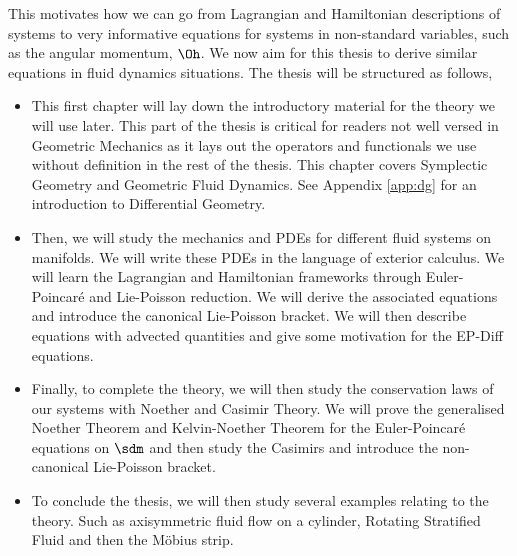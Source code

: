 \noindent
This motivates how we can go from Lagrangian and Hamiltonian descriptions of systems to very informative equations for systems in non-standard variables, such as the angular momentum, $\Oh$. We now aim for this thesis to derive similar equations in fluid dynamics situations. The thesis will be structured as follows,
\begin{itemize}
  \item This first chapter will lay down the introductory material for the theory we will use later. This part of the thesis is critical for readers not well versed in Geometric Mechanics as it lays out the operators and functionals we use without definition in the rest of the thesis. This chapter covers Symplectic Geometry and Geometric Fluid Dynamics. See Appendix \ref{app:dg} for an introduction to Differential Geometry.
  \item Then, we will study the mechanics and PDEs for different fluid systems on manifolds. We will write these PDEs in the language of exterior calculus. We will learn the Lagrangian and Hamiltonian frameworks through Euler-Poincar\'e and Lie-Poisson reduction. We will derive the associated equations and introduce the canonical Lie-Poisson bracket. We will then describe equations with advected quantities and give some motivation for the EP-Diff equations.
  \item Finally, to complete the theory, we will then study the conservation laws of our systems with Noether and Casimir Theory. We will prove the generalised Noether Theorem and Kelvin-Noether Theorem for the Euler-Poincar\'e equations on $\sdm$ and then study the Casimirs and introduce the non-canonical Lie-Poisson bracket.
  \item To conclude the thesis, we will then study several examples relating to the theory. Such as axisymmetric fluid flow on a cylinder, Rotating Stratified Fluid and then the M\"obius strip.
\end{itemize}

